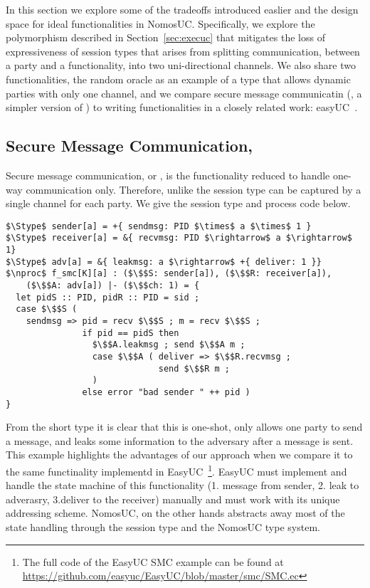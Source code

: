 In this section we explore some of the tradeoffs introduced easlier and the design space for ideal functionalities in NomosUC.
Specifically, we explore the polymorphism described in Section~\ref{sec:execuc} that mitigates the loss of expressiveness of session types that arises from splitting communication, between a party and a functionality, into two uni-directional channels.
We also share two functionalities, the random oracle \Fro as an example of a type that allows dynamic parties with only one channel, and we compare secure message communicatin (\Fsmc, a simpler version of \Fauth) to writing functionalities in a closely related work: easyUC~\cite{easyuc}.

\subsection{Secure Message Communication, \Fsmc}
Secure message communication, or \Fsmc, is the \Fauth functionality reduced to handle one-way communication only.
Therefore, unlike \Fauth the session type can be captured by a single channel for each party. 
We give the session type and process code below.
\begin{lstlisting}[basicstyle=\scriptsize\BeraMonottFamily, frame=single, mathescape, xleftmargin=2em, xrightmargin=2em]
$\Stype$ sender[a] = +{ sendmsg: PID $\times$ a $\times$ 1 }
$\Stype$ receiver[a] = &{ recvmsg: PID $\rightarrow$ a $\rightarrow$ 1}
$\Stype$ adv[a] = &{ leakmsg: a $\rightarrow$ +{ deliver: 1 }}
$\nproc$ f_smc[K][a] : ($\$$S: sender[a]), ($\$$R: receiver[a]), 
	($\$$A: adv[a]) |- ($\$$ch: 1) = {
  let pidS :: PID, pidR :: PID = sid ;
  case $\$$S (
    sendmsg => pid = recv $\$$S ; m = recv $\$$S ;
               if pid == pidS then
                 $\$$A.leakmsg ; send $\$$A m ;
                 case $\$$A ( deliver => $\$$R.recvmsg ;
                              send $\$$R m ;
                 )
               else error "bad sender " ++ pid )
}
\end{lstlisting}
From the short type it is clear that this is one-shot, only allows one party to send a message, and leaks some information to the adversary after a message is sent. 
This example highlights the advantages of our approach when we compare it to the same functinality implementd in EasyUC~\footnote{The full code of the EasyUC SMC example can be found at \url{https://github.com/easyuc/EasyUC/blob/master/smc/SMC.ec}}.
EasyUC must implement and handle the state machine of this functionality (1. message from sender, 2. leak to adverasry, 3.deliver to the receiver) manually and must work with its unique addressing scheme.
NomosUC, on the other hands abstracts away most of the state handling through the session type and the NomosUC type system. 

